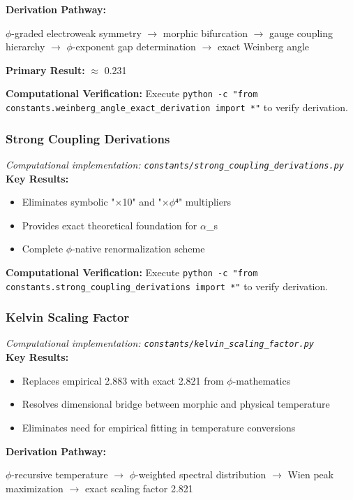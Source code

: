 \textbf{Derivation Pathway:}

$\phi$-graded electroweak symmetry $\to$ morphic bifurcation $\to$ gauge coupling hierarchy $\to$
$\phi$-exponent gap determination $\to$ exact Weinberg angle

\textbf{Primary Result:} $\approx$ 0.231

\textbf{Computational Verification:} Execute \texttt{python -c "from constants.weinberg_angle_exact_derivation import *"} to verify derivation.

\subsubsection{Strong Coupling Derivations}
\textit{Computational implementation: \texttt{constants/strong_coupling_derivations.py}}\\

\textbf{Key Results:}
\begin{itemize}
    \item Eliminates symbolic "$\times$10" and "$\times$$\phi$⁴" multipliers
    \item Provides exact theoretical foundation for $\alpha$_s
    \item Complete $\phi$-native renormalization scheme
\end{itemize}

\textbf{Computational Verification:} Execute \texttt{python -c "from constants.strong_coupling_derivations import *"} to verify derivation.

\subsubsection{Kelvin Scaling Factor}
\textit{Computational implementation: \texttt{constants/kelvin_scaling_factor.py}}\\

\textbf{Key Results:}
\begin{itemize}
    \item Replaces empirical 2.883 with exact 2.821 from $\phi$-mathematics
    \item Resolves dimensional bridge between morphic and physical temperature
    \item Eliminates need for empirical fitting in temperature conversions
\end{itemize}

\textbf{Derivation Pathway:}

$\phi$-recursive temperature $\to$ $\phi$-weighted spectral distribution $\to$ 
Wien peak maximization $\to$ exact scaling factor 2.821

